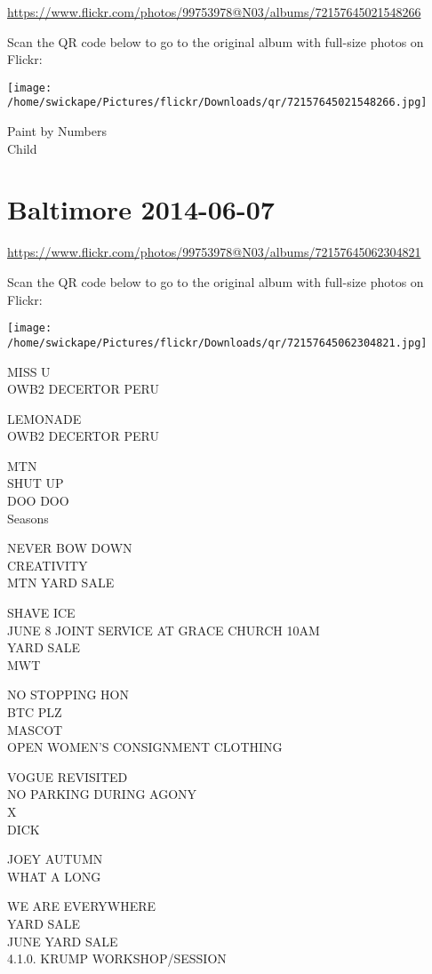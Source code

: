 \documentclass[10pt,letterpaper]{article}
\begin{document}
\url{https://www.flickr.com/photos/99753978@N03/albums/72157645021548266}

Scan the QR code below to go to the original album with full-size photos on Flickr:

\texttt{[image: /home/swickape/Pictures/flickr/Downloads/qr/72157645021548266.jpg]}
\pagebreak

Paint by Numbers\\
Child
\pagebreak

\section*{Baltimore 2014-06-07}

\url{https://www.flickr.com/photos/99753978@N03/albums/72157645062304821}

Scan the QR code below to go to the original album with full-size photos on Flickr:

\texttt{[image: /home/swickape/Pictures/flickr/Downloads/qr/72157645062304821.jpg]}
\pagebreak

MISS U\\
OWB2 DECERTOR PERU

LEMONADE\\
OWB2 DECERTOR PERU

MTN\\
SHUT UP\\
DOO DOO\\
Seasons

NEVER BOW DOWN\\
CREATIVITY\\
MTN YARD SALE

SHAVE ICE\\
JUNE 8 JOINT SERVICE AT GRACE CHURCH 10AM\\
YARD SALE\\
MWT

NO STOPPING HON\\
BTC PLZ\\
MASCOT\\
OPEN WOMEN'S CONSIGNMENT CLOTHING

VOGUE REVISITED\\
NO PARKING DURING AGONY\\
X\\
DICK

JOEY AUTUMN\\
WHAT A LONG

WE ARE EVERYWHERE\\
YARD SALE\\
JUNE YARD SALE\\
4.1.0. KRUMP WORKSHOP/SESSION
\end{document}
